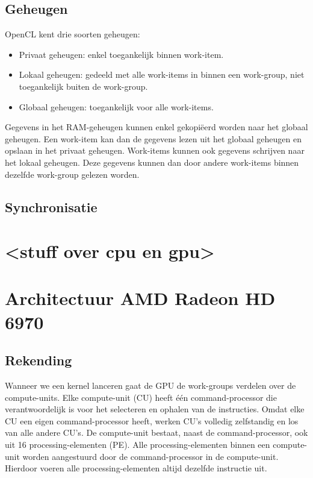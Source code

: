 \subsection{Geheugen}
\label{h:opencl:geheugen}
OpenCL kent drie soorten geheugen:
\begin{itemize}
    \item Privaat geheugen: enkel toegankelijk binnen work-item.
    \item Lokaal geheugen: gedeeld met alle work-items in binnen een work-group, niet toegankelijk buiten de work-group.
    \item Globaal geheugen: toegankelijk voor alle work-items.
\end{itemize}

Gegevens in het RAM-geheugen kunnen enkel gekopi\"eerd worden naar het globaal geheugen. Een work-item kan dan de gegevens lezen uit het globaal geheugen en opslaan in het privaat geheugen. Work-items kunnen ook gegevens schrijven naar het lokaal geheugen. Deze gegevens kunnen dan door andere work-items binnen dezelfde work-group gelezen worden. 

\subsection{Synchronisatie}

\section{<stuff over cpu en gpu>}


\section{Architectuur AMD Radeon HD 6970}
\subsection{Rekending}

Wanneer we een kernel lanceren gaat de GPU de work-groups verdelen over de compute-units. Elke compute-unit (CU) heeft \'e\'en command-processor die verantwoordelijk is voor het selecteren en ophalen van de instructies. Omdat elke CU een eigen command-processor heeft, werken CU's volledig zelfstandig en los van alle andere CU's.  De compute-unit bestaat, naast de command-processor, ook uit 16 processing-elementen (PE). Alle processing-elementen binnen een compute-unit worden aangestuurd door de command-processor in de compute-unit. Hierdoor voeren alle processing-elementen altijd dezelfde instructie uit.

